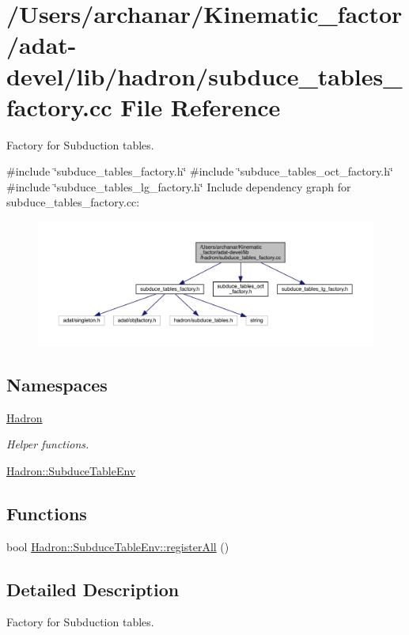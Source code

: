 \hypertarget{adat-devel_2lib_2hadron_2subduce__tables__factory_8cc}{}\section{/\+Users/archanar/\+Kinematic\+\_\+factor/adat-\/devel/lib/hadron/subduce\+\_\+tables\+\_\+factory.cc File Reference}
\label{adat-devel_2lib_2hadron_2subduce__tables__factory_8cc}


Factory for Subduction tables.  


{\ttfamily \#include \char`\"{}subduce\+\_\+tables\+\_\+factory.\+h\char`\"{}}\newline
{\ttfamily \#include \char`\"{}subduce\+\_\+tables\+\_\+oct\+\_\+factory.\+h\char`\"{}}\newline
{\ttfamily \#include \char`\"{}subduce\+\_\+tables\+\_\+lg\+\_\+factory.\+h\char`\"{}}\newline
Include dependency graph for subduce\+\_\+tables\+\_\+factory.\+cc\+:
\nopagebreak
\begin{figure}[H]
\begin{center}
\leavevmode
\includegraphics[width=350pt]{d1/d8e/adat-devel_2lib_2hadron_2subduce__tables__factory_8cc__incl}
\end{center}
\end{figure}
\subsection*{Namespaces}
\begin{DoxyCompactItemize}
\item 
 \mbox{\hyperlink{namespaceHadron}{Hadron}}
\begin{DoxyCompactList}\small\item\em Helper functions. \end{DoxyCompactList}\item 
 \mbox{\hyperlink{namespaceHadron_1_1SubduceTableEnv}{Hadron\+::\+Subduce\+Table\+Env}}
\end{DoxyCompactItemize}
\subsection*{Functions}
\begin{DoxyCompactItemize}
\item 
bool \mbox{\hyperlink{namespaceHadron_1_1SubduceTableEnv_a168dd05273b8d8f0ca1cfb57fbe63e23}{Hadron\+::\+Subduce\+Table\+Env\+::register\+All}} ()
\end{DoxyCompactItemize}


\subsection{Detailed Description}
Factory for Subduction tables. 

